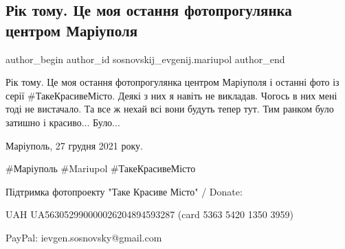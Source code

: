 
 
 
 
 

\subsection{Рік тому. Це моя остання фотопрогулянка центром Маріуполя}
\label{sec:26_12_2022.fb.sosnovskij_evgenij.mariupol.1.r_k_tomu__tse_moya_o}

\ifcmt
 author_begin
   author_id sosnovskij_evgenij.mariupol
 author_end
\fi

Рік тому. Це моя остання фотопрогулянка центром Маріуполя і останні фото із
серії \#ТакеКрасивеМісто. Деякі з них я навіть не викладав. Чогось в них мені
тоді не вистачало. Та все ж нехай всі вони будуть тепер тут. Тим ранком було
затишно і красиво... Було...

Маріуполь, 27 грудня 2021 року.

\#Маріуполь \#Mariupol \#ТакеКрасивеМісто

Підтримка фотопроекту "Таке Красиве Місто" / Donate:

UAH UA563052990000026204894593287 (card 5363 5420 1350 3959)

PayPal: ievgen.sosnovsky@gmail.com
